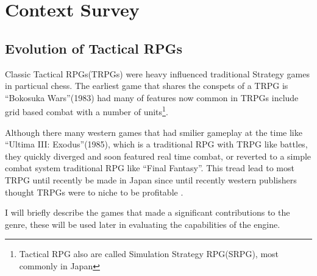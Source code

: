 
\section{Context Survey} 
\label{Context_Survey}

\subsection{Evolution of Tactical RPGs }
\label{sub:evolution_of_tactical_rpgs_}

Classic Tactical RPGs(TRPGs)  were heavy influenced traditional Strategy games in particual chess.  The earliest game that shares the conspets of a TRPG is ``Bokosuka Wars''(1983) had many of features now common in TRPGs include grid based combat with a number of units\cite{BokosukaWars}\footnote{Tactical RPG also are called Simulation Strategy RPG(SRPG),  most commonly in Japan}. 

Although there many western games that had smilier gameplay at the time like ``Ultima III: Exodus''(1985), which is a traditional RPG with TRPG like battles, they quickly diverged and soon featured real time combat, or reverted to a simple combat system traditional RPG like ``Final Fantasy''.  This tread lead to most TRPG until recently be made in Japan since until recently western publishers  thought TRPGs were to niche to be profitable \cite{notrpg}. 

I will briefly describe  the games that made a significant contributions to the genre, these will be used later in evaluating the capabilities of the engine.

